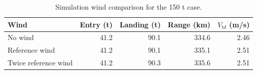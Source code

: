 \begin{table}[htbp]
\caption{Simulation wind comparison for the 150 t case.}
\label{tab:src9}
\small
\setlength{\tabcolsep}{3.5pt}
\begin{tabularx}{\linewidth}{@{}Xrrrr@{}}
\toprule
Wind & Entry (t) & Landing (t) & Range (km) & $V_{td}$ (m/s) \\
\midrule
No wind & 41.2 & 90.1 & 334.6 & 2.46 \\
Reference wind & 41.2 & 90.1 & 335.1 & 2.51 \\
Twice reference wind & 41.2 & 90.3 & 335.6 & 2.51 \\
\bottomrule
\end{tabularx}
\end{table}
